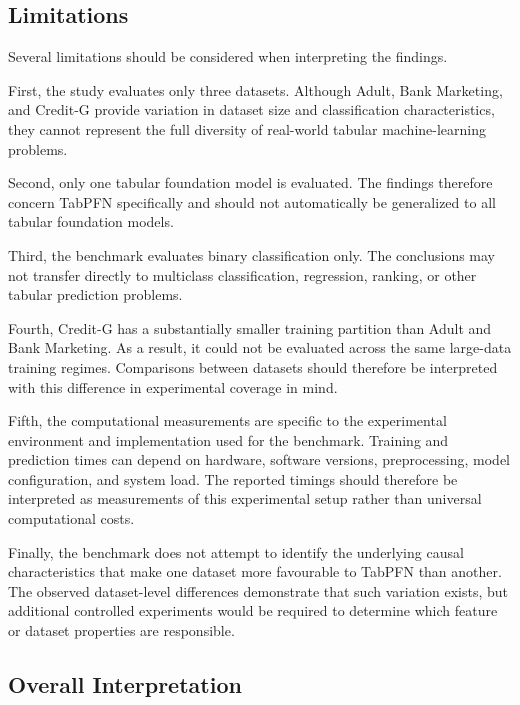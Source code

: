 \subsection{Limitations}



Several limitations should be considered when interpreting the findings.



First, the study evaluates only three datasets. Although Adult, Bank Marketing, and Credit-G provide variation in dataset size and classification characteristics, they cannot represent the full diversity of real-world tabular machine-learning problems.



Second, only one tabular foundation model is evaluated. The findings therefore concern TabPFN specifically and should not automatically be generalized to all tabular foundation models.



Third, the benchmark evaluates binary classification only. The conclusions may not transfer directly to multiclass classification, regression, ranking, or other tabular prediction problems.



Fourth, Credit-G has a substantially smaller training partition than Adult and Bank Marketing. As a result, it could not be evaluated across the same large-data training regimes. Comparisons between datasets should therefore be interpreted with this difference in experimental coverage in mind.



Fifth, the computational measurements are specific to the experimental environment and implementation used for the benchmark. Training and prediction times can depend on hardware, software versions, preprocessing, model configuration, and system load. The reported timings should therefore be interpreted as measurements of this experimental setup rather than universal computational costs.



Finally, the benchmark does not attempt to identify the underlying causal characteristics that make one dataset more favourable to TabPFN than another. The observed dataset-level differences demonstrate that such variation exists, but additional controlled experiments would be required to determine which feature or dataset properties are responsible.



\subsection{Overall Interpretation}



